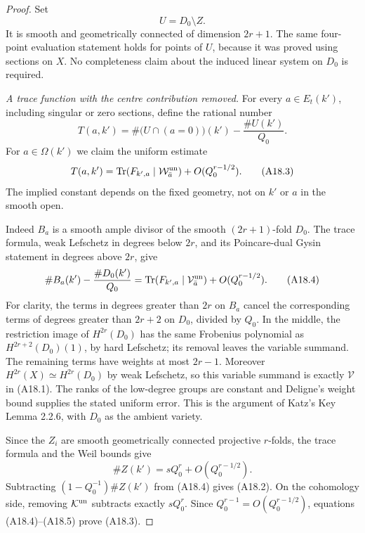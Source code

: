 \documentclass[11pt]{article}
\theoremstyle{remark}\newtheorem{remark}[theorem]{Remark}
\begin{document}
\begin{proof}
Set
\[
                     U=D_0\setminus Z.
\]
It is smooth and geometrically connected of dimension $2r+1$.
The same four-point evaluation statement holds for points of $U$,
because it was proved using sections on $X$. No completeness
claim about the induced linear system on $D_0$ is required.

\emph{A trace function with the centre contribution removed.}
For every $a\in E_t(k')$, including singular or zero sections,
define the rational number
\[
 T(a,k')=\#\bigl(U\cap(a=0)\bigr)(k')-\frac{\#U(k')}{Q_0}.
                                                               \tag{A18.2}
\]
For $a\in\Omega(k')$ we claim the uniform estimate
\[
 T(a,k')=\operatorname{Tr}
       (F_{k',a}\mid\mathcal W^{\rm un}_{\bar a})
                   +O(Q_0^{r-1/2}).                            \tag{A18.3}
\]
The implied constant depends on the fixed geometry, not on $k'$
or $a$ in the smooth open.

Indeed $B_a$ is a smooth ample divisor of the smooth
$(2r+1)$-fold $D_0$. The trace formula, weak Lefschetz in degrees
below $2r$, and its Poincare-dual Gysin statement in degrees above
$2r$, give
\[
 \#B_a(k')-\frac{\#D_0(k')}{Q_0}
       =\operatorname{Tr}(F_{k',a}\mid\mathcal V^{\rm un}_{\bar a})
                       +O(Q_0^{r-1/2}).                       \tag{A18.4}
\]
For clarity, the terms in degrees greater than $2r$ on $B_a$
cancel the corresponding terms of degrees greater than $2r+2$
on $D_0$, divided by $Q_0$. In the middle, the restriction image
of $H^{2r}(D_0)$ has the same Frobenius polynomial as
$H^{2r+2}(D_0)(1)$, by hard Lefschetz; its removal leaves the
variable summand. The remaining terms have weights at most
$2r-1$. Moreover $H^{2r}(X)\simeq H^{2r}(D_0)$ by weak
Lefschetz, so this variable summand is exactly $\mathcal V$ in
(A18.1). The ranks of the low-degree groups are constant and
Deligne's weight bound supplies the stated uniform error.
This is the argument of Katz's Key Lemma 2.2.6, with $D_0$ as
the ambient variety.

Since the $Z_i$ are smooth geometrically connected projective
$r$-folds, the trace formula and the Weil bounds give
\[
                      \#Z(k')=sQ_0^r+O(Q_0^{r-1/2}).           \tag{A18.5}
\]
Subtracting $(1-Q_0^{-1})\#Z(k')$ from (A18.4) gives (A18.2).
On the cohomology side, removing $\mathcal K^{\rm un}$ subtracts
exactly $sQ_0^r$. Since $Q_0^{r-1}=O(Q_0^{r-1/2})$, equations
(A18.4)--(A18.5) prove (A18.3).


\end{proof}
\end{document}
